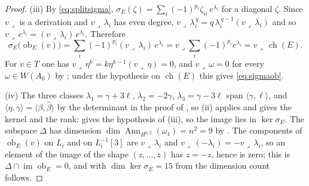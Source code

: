 \documentclass[11pt,reqno]{amsart}
\theoremstyle{plain}
\theoremstyle{definition}
\theoremstyle{remark}
\newcommand{\HW}{W}                      %
\DeclareMathOperator{\ch}{ch}
\DeclareMathOperator{\image}{im}
\DeclareMathOperator{\ob}{ob}
\DeclareMathOperator{\Ann}{Ann}
\begin{document}
\begin{proof}
(iii) By \eqref{eq:splitsigma}, $\sigma_{E}(\zeta)=\sum_{i}(-1)^{p_{i}}
\zeta_{ii}\,e^{\lambda_{i}}$ for a diagonal $\zeta$. Since $v\lrcorner$ is a
derivation and $v\lrcorner\,\lambda_{i}$ has even degree,
$v\lrcorner\,\lambda_{i}^{\,q}=q\,\lambda_{i}^{\,q-1}(v\lrcorner\,\lambda_{i})$
and so $v\lrcorner\,e^{\lambda_{i}}=(v\lrcorner\,\lambda_{i})\,e^{\lambda_{i}}$.
Therefore
\[
  \sigma_{E}\bigl(\ob_{E}(v)\bigr)
  =\sum_{i}(-1)^{p_{i}}(v\lrcorner\,\lambda_{i})\,e^{\lambda_{i}}
  =v\lrcorner\sum_{i}(-1)^{p_{i}}e^{\lambda_{i}}
  =v\lrcorner\,\ch(E).
\]
For $v\in T$ one has $v\lrcorner\,\eta^{k}=k\eta^{k-1}(v\lrcorner\,\eta)=0$,
and $v\lrcorner\,\omega=0$ for every $\omega\in\HW(A_{0})$ by
\cite[Proposition~9.14]{paperI}; under the hypothesis on $\ch(E)$ this gives
\eqref{eq:sigmaob}.

(iv) The three classes $\lambda_{1}=\gamma+3\ell$, $\lambda_{2}=-2\gamma$,
$\lambda_{3}=\gamma-3\ell$ span $\langle\gamma,\ell\rangle$, and
$\langle\eta,\gamma\rangle=\langle\beta,\widehat\beta\rangle$ by the
determinant in the proof of , so (ii) applies and
gives the kernel and the rank;  gives the
hypothesis of (iii), so the image lies in $\ker\sigma_{E}$. The subspace
$\Delta$ has dimension $\dim\Ann_{H^{0,2}}(\omega_{1})=n^{2}=9$ by
\cite[Lemma~9.6]{paperI}. The components of $\ob_{E}(v)$ on $L_{i}$ and on
$L_{i}^{-1}[3]$ are $v\lrcorner\,\lambda_{i}$ and
$v\lrcorner\,(-\lambda_{i})=-v\lrcorner\,\lambda_{i}$, so an element of the
image of the shape $(z,\dots,z)$ has $z=-z$, hence is zero; this is
$\Delta\cap\image\ob_{E}=0$, and with $\dim\ker\sigma_{E}=15$ from
 the dimension count follows.
\end{proof}
\end{document}
